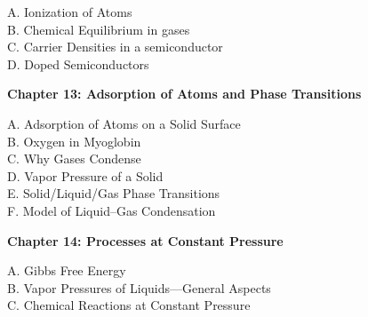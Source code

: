 \documentclass[12pt]{article}
\theoremstyle{definition} %
\theoremstyle{plain} %
\begin{document}
\noindent A. Ionization of Atoms \\
\noindent B. Chemical Equilibrium in gases \\
\noindent C. Carrier Densities in a semiconductor \\
\noindent D. Doped Semiconductors \\

\vspace{1em}

\noindent \textbf{Chapter 13: Adsorption of Atoms and Phase Transitions}

\noindent A. Adsorption of Atoms on a Solid Surface \\
\noindent B. Oxygen in Myoglobin \\
\noindent C. Why Gases Condense \\
\noindent D. Vapor Pressure of a Solid \\
\noindent E. Solid/Liquid/Gas Phase Transitions \\
\noindent F. Model of Liquid--Gas Condensation 

\vspace{1em}

\noindent \textbf{Chapter 14: Processes at Constant Pressure}

\noindent A. Gibbs Free Energy \\
\noindent B. Vapor Pressures of Liquids---General Aspects \\
\noindent C. Chemical Reactions at Constant Pressure 
\end{document}
